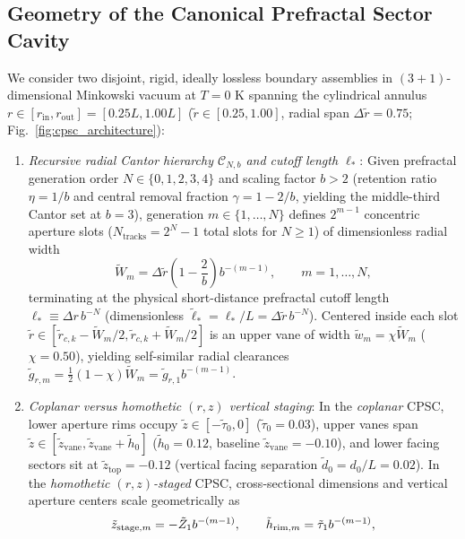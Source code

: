 \documentclass[aps,prd,twocolumn,10pt,showkeys,nofootinbib,floatfix,longbibliography]{revtex4-2}
\begin{document}
\subsection{Geometry of the Canonical Prefractal Sector Cavity}
We consider two disjoint, rigid, ideally lossless boundary assemblies in $(3+1)$-dimensional Minkowski vacuum at $T = 0\text{ K}$ spanning the cylindrical annulus $r \in [r_{\mathrm{in}}, r_{\mathrm{out}}] = [0.25 L, 1.00 L]$ ($\tilde{r} \in [0.25, 1.00]$, radial span $\Delta\tilde{r} = 0.75$; Fig.~\ref{fig:cpsc_architecture}):
\begin{enumerate}
    \item \emph{Recursive radial Cantor hierarchy $\mathcal{C}_{N,b}$ and cutoff length $\ell_*$}: Given prefractal generation order $N \in \{0,1,2,3,4\}$ and scaling factor $b > 2$ (retention ratio $\eta = 1/b$ and central removal fraction $\gamma = 1 - 2/b$, yielding the middle-third Cantor set at $b=3$), generation $m \in \{1,\dots,N\}$ defines $2^{m-1}$ concentric aperture slots ($N_{\mathrm{tracks}} = 2^N - 1$ total slots for $N \ge 1$) of dimensionless radial width
    \begin{equation}
    \tilde{W}_m = \Delta\tilde{r}\left(1 - \frac{2}{b}\right) b^{-(m-1)}, \qquad m = 1,\dots,N,
    \label{eq:cantor_widths}
    \end{equation}
    terminating at the physical short-distance prefractal cutoff length $\ell_* \equiv \Delta r\, b^{-N}$ (dimensionless $\tilde{\ell}_* = \ell_*/L = \Delta\tilde{r}\,b^{-N}$). Centered inside each slot $\tilde{r} \in [\tilde{r}_{c,k} - \tilde{W}_m/2, \tilde{r}_{c,k} + \tilde{W}_m/2]$ is an upper vane of width $\tilde{w}_m = \chi \tilde{W}_m$ ($\chi = 0.50$), yielding self-similar radial clearances $\tilde{g}_{r,m} = \frac{1}{2}(1-\chi)\tilde{W}_m = \tilde{g}_{r,1} b^{-(m-1)}$.
    \item \emph{Coplanar versus homothetic $(r,z)$ vertical staging}: In the \emph{coplanar} CPSC, lower aperture rims occupy $\tilde{z} \in [-\tilde{\tau}_0, 0]$ ($\tilde{\tau}_0 = 0.03$), upper vanes span $\tilde{z} \in [\tilde{z}_{\mathrm{vane}}, \tilde{z}_{\mathrm{vane}} + \tilde{h}_0]$ ($\tilde{h}_0 = 0.12$, baseline $\tilde{z}_{\mathrm{vane}} = -0.10$), and lower facing sectors sit at $\tilde{z}_{\mathrm{top}} = -0.12$ (vertical facing separation $\tilde{d}_0 = d_0/L = 0.02$). In the \emph{homothetic $(r,z)$-staged} CPSC, cross-sectional dimensions and vertical aperture centers scale geometrically as
    \begin{equation}
    \tilde{z}_{{\rm stage},m} = -\tilde{Z}_1 b^{-(m-1)}, \qquad \tilde{h}_{{\rm rim},m} = \tilde{\tau}_1 b^{-(m-1)},

\end{equation}
\end{enumerate}
\end{document}
